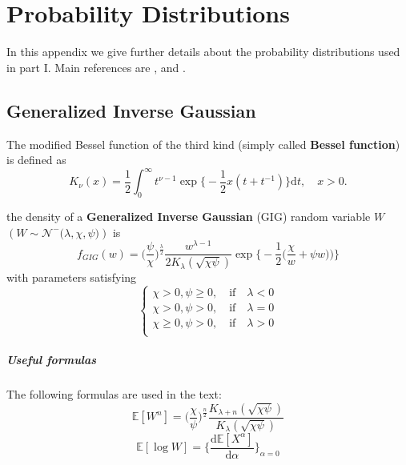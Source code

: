 \chapter{Probability Distributions} \label{app:B}
In this appendix we give further details about the probability distributions used in part I. Main references are \cite{Brey2013}, \cite{paolella2007intermediate} and \cite{McNeil2005}.
\section{Generalized Inverse Gaussian}
\begin{definition}
	The modified Bessel function of the third kind (simply called \textbf{Bessel function}) is defined as \[ K_{\nu}(x) = \frac{1}{2}\int_{0}^{\infty}t^{\nu-1}\exp\big\{-\frac{1}{2}x(t + t^{-1})\big\}\mathrm{d}t, \quad x > 0.  \]
\end{definition}
\begin{definition}
	the density of a \textbf{Generalized Inverse Gaussian} (GIG) random variable $W$ $(W \sim \mathcal{N}^-\big(\lambda,\chi,\psi \big))$ is 
	\begin{equation}\label{eq:GIGdensity}
	f_{GIG}(w) = \Big(\frac{\psi}{\chi}\Big)^{\frac{\lambda}{2}}\frac{w^{\lambda-1}}{2K_{\lambda}(\sqrt{\chi\psi})}\exp\Big\{-\frac{1}{2}\big(\frac{\chi}{w}+\psi w\big)\big)\Big\} 
	\end{equation}
	with parameters satisfying 
	\[
	\begin{cases}
	\chi >0,\psi \geq 0, \quad \text{if} \quad \lambda <0\\
	\chi >0,\psi > 0, \quad \text{if} \quad \lambda =0\\
	\chi \geq0,\psi > 0, \quad \text{if} \quad \lambda >0\\
	\end{cases}
	\]
\end{definition}
\paragraph{Useful formulas}
The following formulas are used in the text:
\begin{equation}\label{eq:GIG_moment}
\mathbb{E}[W^n] = \Big(\frac{\chi}{\psi}\Big)^{\frac{n}{2}}\frac{K_{\lambda+n}(\sqrt{\chi\psi})}{K_{\lambda}(\sqrt{\chi\psi})}
\end{equation}
\begin{equation}\label{eq:GIG_log}
\mathbb{E}[\log W] = \Big\{\frac{\mathrm{d}\mathbb{E}[X^{\alpha}]}{\mathrm{d}\alpha}\Big\}_{\alpha=0}
\end{equation}
